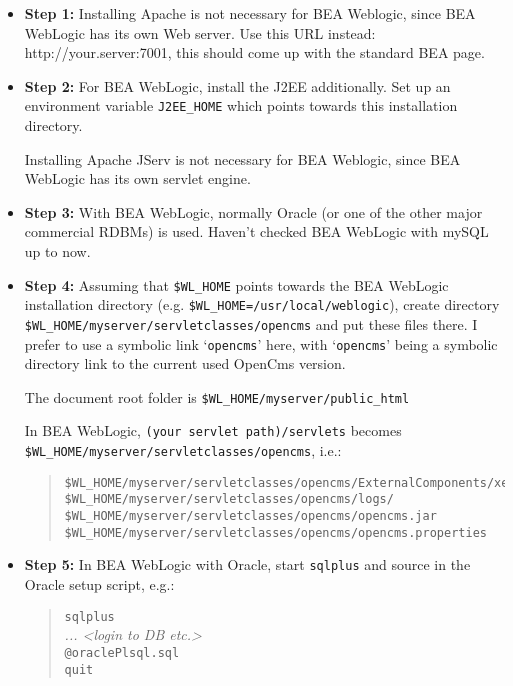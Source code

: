 \begin{itemize}

\item \textbf{Step 1:} Installing Apache is not necessary for BEA Weblogic,
since BEA WebLogic has its own Web server. Use this URL instead:
http://your.server:7001, this should come up with the standard BEA
page.

\item \textbf{Step 2:} For BEA WebLogic, install the J2EE additionally. Set up
an environment variable \texttt{J2EE\_HOME} which points towards this
installation directory.

Installing Apache JServ is not necessary for BEA
Weblogic, since BEA WebLogic has its own servlet engine.

\item \textbf{Step 3:} With BEA WebLogic, normally Oracle (or one of the other
major commercial RDBMs) is used. Haven't checked BEA WebLogic with
mySQL up to now.

\item \textbf{Step 4:} Assuming that \texttt{\$WL\_HOME} points towards the BEA WebLogic
installation directory (e.g. \texttt{\$WL\_HOME=/usr/local/weblogic}), create
directory\\
\texttt{\$WL\_HOME/myserver/servletclasses/opencms} and put these files
there. I prefer to use a symbolic link `\texttt{opencms}' here, with `\texttt{opencms}'
being a symbolic directory link to the current used OpenCms version.

The document root folder is \texttt{\$WL\_HOME/myserver/public\_html}

In BEA WebLogic, \texttt{(your servlet path)/servlets} becomes\\ 
\texttt{\$WL\_HOME/myserver/servletclasses/opencms}, i.e.:
\begin{quote}
\begin{verbatim}
$WL_HOME/myserver/servletclasses/opencms/ExternalComponents/xerces.jar
$WL_HOME/myserver/servletclasses/opencms/logs/
$WL_HOME/myserver/servletclasses/opencms/opencms.jar
$WL_HOME/myserver/servletclasses/opencms/opencms.properties
\end{verbatim}
\end{quote}


\item \textbf{Step 5:} In BEA WebLogic with Oracle, start \texttt{sqlplus} and source in
the Oracle setup script, e.g.:
\begin{quote}
\texttt{sqlplus\\}
\textit{ ... <login to DB etc.>} \texttt{\\
@oraclePlsql.sql \\
quit}
\end{quote}


\end{itemize}
